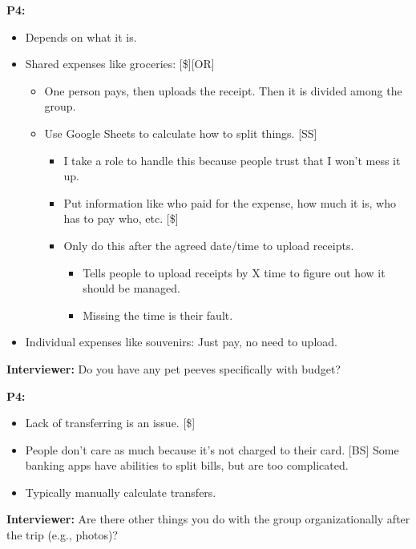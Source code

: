 \documentclass[12pt,a4paper]{article}
\begin{document}
\textbf{P4:}

\begin{itemize}
    \item Depends on what it is. 
    \item Shared expenses like groceries: [\$][OR]
    \begin{itemize}
        \item One person pays, then uploads the receipt. Then it is divided among the group. 
        \item Use Google Sheets to calculate how to split things. [SS]
        \begin{itemize}
            \item I take a role to handle this because people trust that I won’t mess it up. 
            \item Put information like who paid for the expense, how much it is, who has to pay who, etc. [\$]
            \item Only do this after the agreed date/time to upload receipts. 
            \begin{itemize}
                \item Tells people to upload receipts by X time to figure out how it should be managed. 
                \item Missing the time is their fault. 
            \end{itemize}
        \end{itemize}
    \end{itemize}
    \item Individual expenses like souvenirs:
Just pay, no need to upload. 

\end{itemize}

\textbf{Interviewer: }Do you have any pet peeves specifically with budget?  

\textbf{P4:}

\begin{itemize}
    \item Lack of transferring is an issue. [\$]
    \item People don’t care as much because it’s not charged to their card. [BS]
Some banking apps have abilities to split bills, but are too complicated.

    \item Typically manually calculate transfers.
\end{itemize}

\textbf{Interviewer: }Are there other things you do with the group organizationally after the trip (e.g., photos)?  
\end{document}

